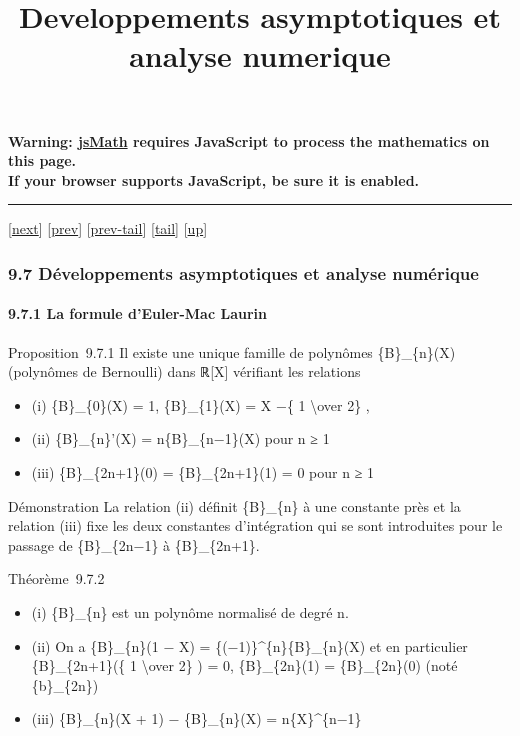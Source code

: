 \documentclass[]{article}
\title{Developpements asymptotiques et analyse numerique}
\author{}
\date{}
\begin{document}
\maketitle

\textbf{Warning: \href{http://www.math.union.edu/locate/jsMath}{jsMath}
requires JavaScript to process the mathematics on this page.\\ If your
browser supports JavaScript, be sure it is enabled.}

\begin{center}\rule{3in}{0.4pt}\end{center}

{[}\href{coursse57.html}{next}{]} {[}\href{coursse55.html}{prev}{]}
{[}\href{coursse55.html\#tailcoursse55.html}{prev-tail}{]}
{[}\hyperref[tailcoursse56.html]{tail}{]}
{[}\href{coursch10.html\#coursse56.html}{up}{]}

\subsubsection{9.7 Développements asymptotiques et analyse numérique}

\paragraph{9.7.1 La formule d'Euler-Mac Laurin}

Proposition~9.7.1 Il existe une unique famille de polynômes
\{B\}\_\{n\}(X) (polynômes de Bernoulli) dans ℝ{[}X{]} vérifiant les
relations

\begin{itemize}
\itemsep1pt\parskip0pt
\item
  (i) \{B\}\_\{0\}(X) = 1, \{B\}\_\{1\}(X) = X −\{ 1
  \textbackslash{}over 2\} ,
\item
  (ii) \{B\}\_\{n\}'(X) = n\{B\}\_\{n−1\}(X) pour n ≥ 1
\item
  (iii) \{B\}\_\{2n+1\}(0) = \{B\}\_\{2n+1\}(1) = 0 pour n ≥ 1
\end{itemize}

Démonstration La relation (ii) définit \{B\}\_\{n\} à une constante près
et la relation (iii) fixe les deux constantes d'intégration qui se sont
introduites pour le passage de \{B\}\_\{2n−1\} à \{B\}\_\{2n+1\}.

Théorème~9.7.2

\begin{itemize}
\itemsep1pt\parskip0pt
\item
  (i) \{B\}\_\{n\} est un polynôme normalisé de degré n.
\item
  (ii) On a \{B\}\_\{n\}(1 − X) = \{(−1)\}\^{}\{n\}\{B\}\_\{n\}(X) et en
  particulier \{B\}\_\{2n+1\}(\{ 1 \textbackslash{}over 2\} ) = 0,
  \{B\}\_\{2n\}(1) = \{B\}\_\{2n\}(0) (noté \{b\}\_\{2n\})
\item
  (iii) \{B\}\_\{n\}(X + 1) − \{B\}\_\{n\}(X) = n\{X\}\^{}\{n−1\}
\end{itemize}
\end{document}
